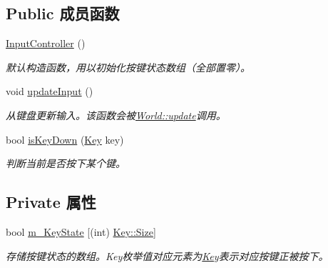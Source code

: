 \subsection*{Public 成员函数}
\begin{DoxyCompactItemize}
\item 
\hyperlink{class_input_controller_aba927fffeb0bf4c4fd0835d4dfbdfaec}{Input\+Controller} ()
\begin{DoxyCompactList}\small\item\em 默认构造函数，用以初始化按键状态数组（全部置零）。 \end{DoxyCompactList}\item 
void \hyperlink{class_input_controller_a2a88542ae1370cf3f5ace3c4bb8813d9}{update\+Input} ()
\begin{DoxyCompactList}\small\item\em 从键盘更新输入。该函数会被\hyperlink{class_world_aac8c1fde63c06577ffc648aaefdb37f0}{World\+::update}调用。 \end{DoxyCompactList}\item 
bool \hyperlink{class_input_controller_a7ed265c719c06edf5a7294e98739d932}{is\+Key\+Down} (\hyperlink{class_input_controller_a840a7425e2220e1ef5659a7ea4ba122d}{Key} key)
\begin{DoxyCompactList}\small\item\em 判断当前是否按下某个键。 \end{DoxyCompactList}\end{DoxyCompactItemize}
\subsection*{Private 属性}
\begin{DoxyCompactItemize}
\item 
bool \hyperlink{class_input_controller_aebe382d8d20e579a3f2c92b58ad53ac3}{m\+\_\+\+Key\+State} \mbox{[}(int) \hyperlink{class_input_controller_a840a7425e2220e1ef5659a7ea4ba122da6f6cb72d544962fa333e2e34ce64f719}{Key\+::\+Size}\mbox{]}
\begin{DoxyCompactList}\small\item\em 存储按键状态的数组。\+Key枚举值对应元素为\hyperlink{class_input_controller_a840a7425e2220e1ef5659a7ea4ba122d}{Key}表示对应按键正被按下。 \end{DoxyCompactList}\end{DoxyCompactItemize}
